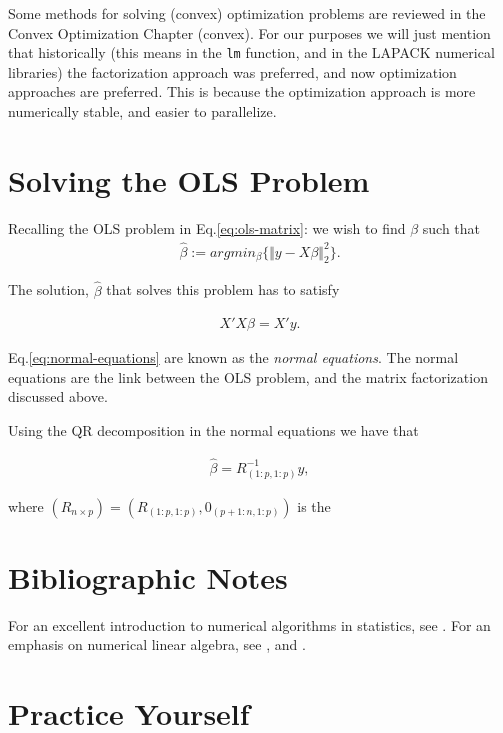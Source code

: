 \documentclass[]{book}
\theoremstyle{definition}
\theoremstyle{definition}
\theoremstyle{definition}
\theoremstyle{remark}
\begin{document}
Some methods for solving (convex) optimization problems are reviewed in
the Convex Optimization Chapter (convex). For our purposes we will
just mention that historically (this means in the \texttt{lm} function,
and in the LAPACK numerical libraries) the factorization approach was
preferred, and now optimization approaches are preferred. This is
because the optimization approach is more numerically stable, and easier
to parallelize.

\section{Solving the OLS Problem}\label{solving-ols}

Recalling the OLS problem in Eq.\eqref{eq:ols-matrix}: we wish to find
\(\beta\) such that\\

\begin{align}
  \hat \beta:= argmin_\beta \{ \Vert y-X\beta \Vert^2_2 \}.
\end{align}

The solution, \(\hat \beta\) that solves this problem has to satisfy

\begin{align}
  X'X \beta = X'y.
  \label{eq:normal-equations}
\end{align}

Eq.\eqref{eq:normal-equations} are known as the \emph{normal equations}.
The normal equations are the link between the OLS problem, and the
matrix factorization discussed above.

Using the QR decomposition in the normal equations we have that

\begin{align*}
  \hat \beta = R_{(1:p,1:p)}^{-1} y,
\end{align*}

where \((R_{n\times p})=(R_{(1:p,1:p)},0_{(p+1:n,1:p)})\) is the

\section{Bibliographic Notes}\label{bibliographic-notes-13}

For an excellent introduction to numerical algorithms in statistics, see
\citet{weihs2013foundations}. For an emphasis on numerical linear
algebra, see \citet{gentle2012numerical}, and \citet{golub2012matrix}.

\section{Practice Yourself}\label{practice-yourself-14}
\end{document}
